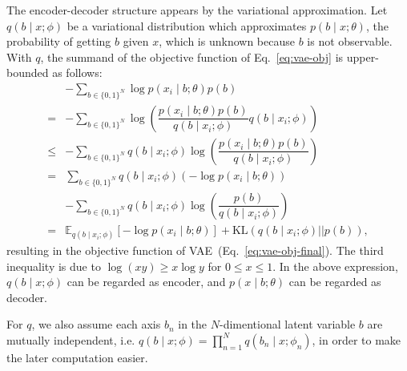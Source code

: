 \documentclass[10pt,letterpaper]{article}
\begin{document}
The encoder-decoder structure appears by the variational approximation.
Let $q(b \mid x;\phi)$ be a variational distribution which approximates $p(b \mid x;\theta)$, the probability of getting $b$ given $x$, which is unknown because $b$ is not observable.
With $q$, the summand of the objective function of Eq.~\eqref{eq:vae-obj} is upper-bounded as follows:
\begin{align}
\nonumber & - \sum_{b\in\{0,1\}^N}\log p(x_i \mid b;\theta)p(b) \\
\nonumber = & - \sum_{b\in\{0,1\}^N} \log \left(\dfrac{p(x_i \mid b;\theta) p(b)}{q(b \mid x_i; \phi)}q(b \mid x_i; \phi)\right)\\
\nonumber\leq & - \sum_{b\in\{0,1\}^N} q(b \mid x_i; \phi)\log \left(\dfrac{p(x_i \mid b;\theta) p(b)}{q(b \mid x_i; \phi)}\right)\\
\nonumber =   &   \sum_{b\in\{0,1\}^N} q(b \mid x_i; \phi) \left(-\log p(x_i \mid b;\theta) \right)\\
\nonumber     & - \sum_{b\in\{0,1\}^N} q(b \mid x_i; \phi)\log \left(\dfrac{p(b)}{q(b \mid x_i; \phi)}\right) \\
\label{eq:vae-obj-final}= & \mathbb{E}_{q(b \mid x_i; \phi)}[-\log p(x_i \mid b;\theta)] + \mathrm{KL}(q(b \mid x_i; \phi) || p(b)),
\end{align}
resulting in the objective function of VAE~(Eq.~\eqref{eq:vae-obj-final}).
The third inequality is due to $\log(xy) \geq x \log y$ for $0\leq x \leq 1$.
In the above expression, $q(b \mid x;\phi)$ can be regarded as encoder, and $p(x\mid b;\theta)$ can be regarded as decoder.

For $q$, we also assume each axis $b_n$ in the $N$-dimentional latent variable $b$ are mutually independent, i.e. $q(b \mid x;\phi)=\prod_{n=1}^N q(b_n \mid x;\phi_n)$,
in order to make the later computation easier.
\end{document}
